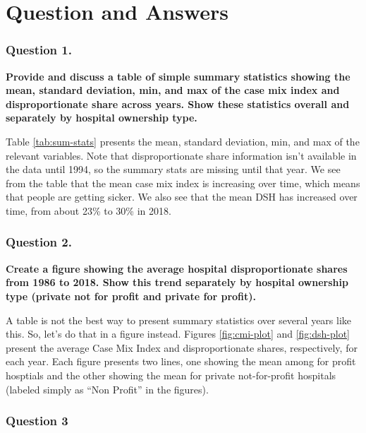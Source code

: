 \documentclass[
  12pt,
]{article}
\begin{document}

\hypertarget{question-and-answers}{%
\section{Question and Answers}\label{question-and-answers}}

\hypertarget{question-1.}{%
\subsubsection{Question 1.}\label{question-1.}}

\textbf{Provide and discuss a table of simple summary statistics showing the mean, standard deviation, min, and max of the case mix index and disproportionate share across years. Show these statistics overall and separately by hospital ownership type.}

Table \ref{tab:sum-stats} presents the mean, standard deviation, min, and max of the relevant variables. Note that disproportionate share information isn't available in the data until 1994, so the summary stats are missing until that year. We see from the table that the mean case mix index is increasing over time, which means that people are getting sicker. We also see that the mean DSH has increased over time, from about 23\% to 30\% in 2018.

\hypertarget{question-2.}{%
\subsubsection{Question 2.}\label{question-2.}}

\textbf{Create a figure showing the average hospital disproportionate shares from 1986 to 2018. Show this trend separately by hospital ownership type (private not for profit and private for profit).}

A table is not the best way to present summary statistics over several years like this. So, let's do that in a figure instead. Figures \ref{fig:cmi-plot} and \ref{fig:dsh-plot} present the average Case Mix Index and disproportionate shares, respectively, for each year. Each figure presents two lines, one showing the mean among for profit hosptials and the other showing the mean for private not-for-profit hospitals (labeled simply as ``Non Profit'' in the figures).

\hypertarget{question-3}{%
\subsubsection{Question 3}\label{question-3}}
\end{document}
